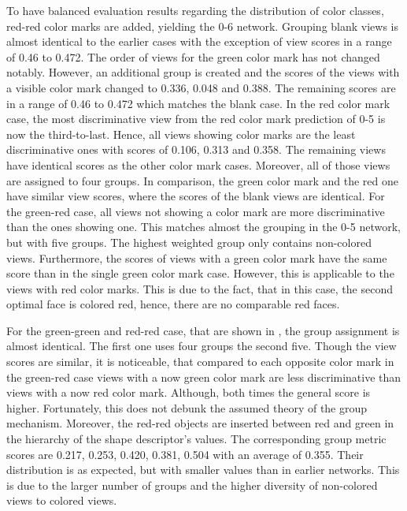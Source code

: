 To have balanced evaluation results regarding the distribution of color classes, red-red color marks are added, yielding the 0-6 network.
Grouping blank views is almost identical to the earlier cases with the exception of view scores in a range of 0.46 to 0.472.
The order of views for the green color mark has not changed notably.
However, an additional group is created and the scores of the views with a visible color mark changed to 0.336, 0.048 and 0.388.
The remaining scores are in a range of 0.46 to 0.472 which matches the blank case.
In the red color mark case, the most discriminative view from the red color mark prediction of 0-5 is now the third-to-last.
Hence, all views showing color marks are the least discriminative ones with scores of 0.106, 0.313 and 0.358.
The remaining views have identical scores as the other color mark cases.
Moreover, all of those views are assigned to four groups.
In comparison, the green color mark and the red one have similar view scores, where the scores of the blank views are identical.
For the green-red case, all views not showing a color mark are more discriminative than the ones showing one.
This matches almost the grouping in the 0-5 network, but with five groups.
The highest weighted group only contains non-colored views.
Furthermore, the scores of views with a green color mark have the same score than in the single green color mark case.
However, this is applicable to the views with red color marks.
This is due to the fact, that in this case, the second optimal face is colored red, hence, there are no comparable red faces.

For the green-green and red-red case, that are shown in , the group assignment is almost identical.
The first one uses four groups the second five.
Though the view scores are similar, it is noticeable, that compared to each opposite color mark in the green-red case views with a now green color mark are less discriminative than views with a now red color mark.
Although, both times the general score is higher.
Fortunately, this does not debunk the assumed theory of the group mechanism.
Moreover, the red-red objects are inserted between red and green in the hierarchy of the shape descriptor's values.
The corresponding group metric scores are 0.217, 0.253, 0.420, 0.381, 0.504 with an average of 0.355.
Their distribution is as expected, but with smaller values than in earlier networks.
This is due to the larger number of groups and the higher diversity of non-colored views to colored views.

